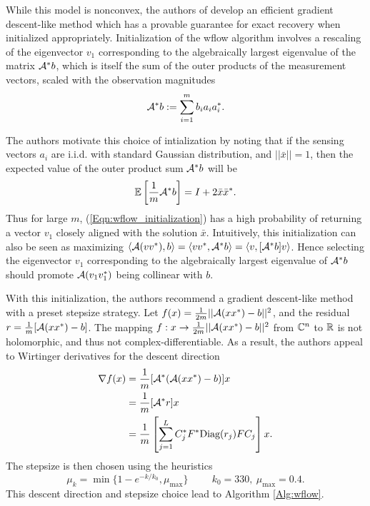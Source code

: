 While this model is nonconvex, the authors of \cite{DBLP:journals/tit/CandesLS15} develop an efficient gradient descent-like method which has a provable guarantee for exact recovery when initialized appropriately.  Initialization of the wflow algorithm involves a rescaling of the eigenvector $v_1$ corresponding to the algebraically largest eigenvalue of the matrix ${\mathcal A}^*b$, which is itself the sum of the outer products of the measurement vectors, scaled with the observation magnitudes
\begin{equation}			\label{Eqn:wflow_initialization}
{\mathcal A}^*b := \sum\limits_{\substack{i=1}}^{\substack{m}}b_i a_i a_i^*.
\end{equation}


The authors motivate this choice of intialization by noting that if the sensing vectors $a_i$ are i.i.d. with standard Gaussian distribution, and $||\bar{x}|| = 1$, then the expected value of the outer product sum ${\mathcal A}^*b$ will be
\begin{equation} 		\label{Eqn:wflow_expected_value}
{\mathbb E} \left[ \frac{1}{m}{\mathcal A}^* b \right] = I + 2\bar{x}\bar{x}^*.
\end{equation}
Thus for large $m$, (\ref{Eqn:wflow_initialization}) has a high probability of returning a vector $v_1$ closely aligned with the solution $\bar{x}$. Intuitively, this initialization can also be seen as maximizing $\langle {\mathcal A}(vv^*), b \rangle	= \langle v v^*, {\mathcal A}^* b \rangle = \langle v, [{\mathcal A}^* b] v \rangle$.  Hence selecting the eigenvector $v_1$ corresponding to the algebraically largest eigenvalue of ${\mathcal A}^*b$ should promote ${\mathcal A}(v_1v_1^*)$ being collinear with $b$.



With this initialization, the authors recommend a gradient descent-like method with a preset stepsize strategy.  Let $f(x) = \frac{1}{2m}||{\mathcal A}(xx^*) - b||^2$, and the residual $r = \frac{1}{m}[{\mathcal A}(xx^*) - b]$.  The mapping $f: x \rightarrow \frac{1}{2m}||{\mathcal A}(xx^*) - b||^2$ from ${\mathbb C}^n$ to ${\mathbb R}$ is not holomorphic, and thus not complex-differentiable.  As a result, the authors appeal to Wirtinger derivatives \cite[Section 6]{DBLP:journals/tit/CandesLS15} for the descent direction
\begin{equation}			\label{Eqn:wflow_derivative}
\begin{split}
\nabla f(x)
	&	= \frac{1}{m} [{\mathcal A}^*({\mathcal A}(xx^*) - b)]x
		\\
	&	= \frac{1}{m}  [{\mathcal A}^*r]x
		\\
	& =  \frac{1}{m}  \left[ \sum\limits_{\substack{j=1}}^{\substack{L}}
					C_j^* F^* \textnormal{Diag}(r_j) F C_j \right] x.
\end{split}
\end{equation}
The stepsize is then chosen using the heuristics \cite[Section 2]{DBLP:journals/tit/CandesLS15}
 \begin{equation} 			\label{Eqn:wflow_stepsize}
\mu_k = \min \{ 1-e^{-k/k_0}, \mu_{\max} \} \hspace{1cm} k_0 = 330, \ \mu_{\max} = 0.4.
\end{equation}
This descent direction and stepsize choice lead to Algorithm \ref{Alg:wflow}.

